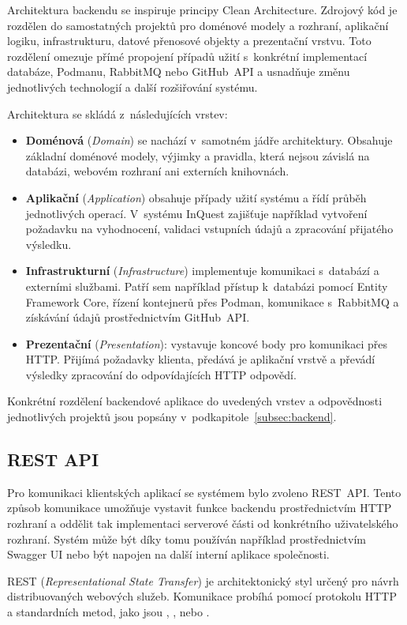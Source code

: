 \documentclass[
  biblatex,
  figures,
  tables,
  glossaries,
  index
]{kidiplom}
\begin{document}
Architektura backendu se inspiruje principy Clean Architecture. Zdrojový kód je rozdělen do samostatných projektů pro doménové modely a rozhraní, aplikační logiku, infrastrukturu, datové přenosové objekty a prezentační vrstvu. Toto rozdělení omezuje přímé propojení případů užití s~konkrétní implementací databáze, Podmanu, RabbitMQ nebo GitHub~API a usnadňuje změnu jednotlivých technologií a další rozšiřování systému.

Architektura se skládá z~následujících vrstev:
\begin{itemize}
	\item \textbf{Doménová} (\textit{Domain}) se nachází v~samotném jádře architektury. Obsahuje základní doménové modely, výjimky a pravidla, která nejsou závislá na databázi, webovém rozhraní ani externích knihovnách.
	\item \textbf{Aplikační} (\textit{Application}) obsahuje případy užití systému a řídí průběh jednotlivých operací. V~systému InQuest zajišťuje například vytvoření požadavku na vyhodnocení, validaci vstupních údajů a zpracování přijatého výsledku.
	\item \textbf{Infrastrukturní} (\textit{Infrastructure}) implementuje komunikaci s~databází a externími službami. Patří sem například přístup k~databázi pomocí Entity Framework Core, řízení kontejnerů přes Podman, komunikace s~RabbitMQ a získávání údajů prostřednictvím GitHub~API.
	\item \textbf{Prezentační} (\textit{Presentation}): vystavuje koncové body pro komunikaci přes HTTP. Přijímá požadavky klienta, předává je aplikační vrstvě a převádí výsledky zpracování do odpovídajících HTTP odpovědí.
\end{itemize}

Konkrétní rozdělení backendové aplikace do uvedených vrstev a odpovědnosti jednotlivých projektů jsou popsány v~podkapitole~\ref{subsec:backend}.


\subsection{REST API}
\label{subsec:restapi}
Pro komunikaci klientských aplikací se systémem bylo zvoleno REST~API. Tento způsob komunikace umožňuje vystavit funkce backendu prostřednictvím HTTP rozhraní a oddělit tak implementaci serverové části od konkrétního uživatelského rozhraní. Systém může být díky tomu používán například prostřednictvím Swagger UI nebo být napojen na další interní aplikace společnosti.

REST (\textit{Representational State Transfer}) je architektonický styl určený pro návrh distribuovaných webových služeb. Komunikace probíhá pomocí protokolu HTTP a standardních metod, jako jsou , ,  nebo .~\cite{restapi}
\end{document}

